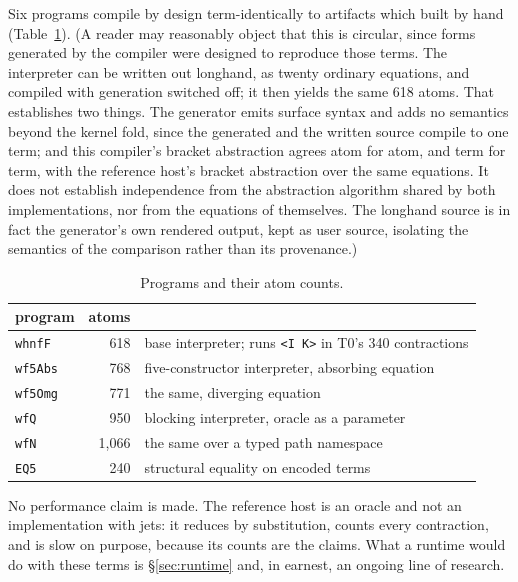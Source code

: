 \documentclass[english,submission,code=tt]{programming}
\begin{document}
Six programs compile by design term-identically to artifacts
which \citet{Davis2027} built by hand (Table~\ref{tab:programs}).
(A reader may reasonably object that this is circular, since forms
generated by the compiler were designed to reproduce those terms.
The interpreter can be written out longhand, as twenty ordinary
equations, and compiled with generation switched off; it then yields the
same 618 atoms.  That establishes two things.  The generator emits
surface syntax and adds no semantics beyond the kernel fold, since the
generated and the written source compile to one term; and this
compiler's bracket abstraction agrees atom for atom, and term for
term, with the reference host's bracket abstraction over the same 
equations.  It does not establish independence from the abstraction 
algorithm shared by both implementations, nor from the equations 
of \citet{Davis2027} themselves.  The longhand 
source is in fact the generator's own rendered output, kept as user 
source, isolating the semantics of the comparison rather than its 
provenance.)

\begin{table}[tb]
\centering
\caption{Programs and their atom counts.}\label{tab:programs}
\begin{center}\small
\begin{tabular}{@{}lrl@{}}
\toprule
program & atoms & \\
\midrule
\texttt{whnfF}  &     618 & base interpreter; runs \texttt{<I K>} in T0's 340 contractions \\
\texttt{wf5Abs} &     768 & five-constructor interpreter, absorbing equation \\
\texttt{wf5Omg} &     771 & the same, diverging equation \\
\texttt{wfQ}    &     950 & blocking interpreter, oracle as a parameter \\
\texttt{wfN}    & 1{,}066 & the same over a typed path namespace \\
\texttt{EQ5}    &     240 & structural equality on encoded terms \\
\bottomrule
\end{tabular}
\end{center}
\end{table}

No performance claim is made.  The reference host is an oracle and
not an implementation with jets: it reduces by substitution, counts every
contraction, and is slow on purpose, because its counts are the claims.
What a runtime would do with these terms is \S\ref{sec:runtime} and, in
earnest, an ongoing line of research.
\end{document}
